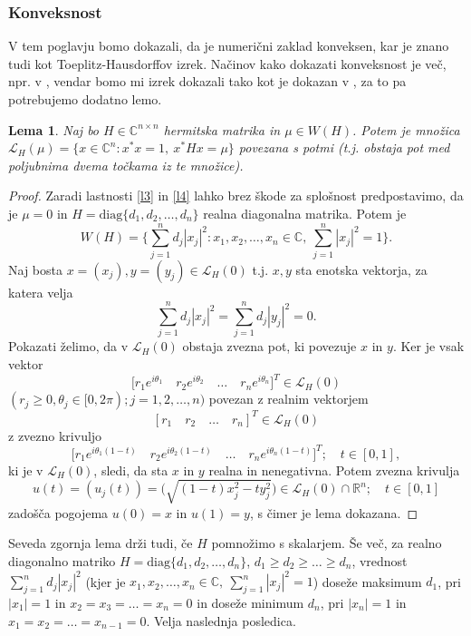\documentclass[12pt,a4paper]{amsart}
\theoremstyle{definition}
\theoremstyle{plain}
\newtheorem{lema}[definicija]{Lema}
\newcommand{\LH}{\mathcal{L}}
\newcommand{\R}{\mathbb R}
\newcommand{\C}{\mathbb C}
\begin{document}
\subsubsection{Konveksnost}
V tem poglavju bomo dokazali, da je numerični zaklad konveksen, kar je znano tudi kot Toeplitz-Hausdorffov izrek. 
Načinov kako dokazati konveksnost je več, npr. v \cite{num}, vendar bomo mi izrek dokazali tako kot je dokazan v \cite{zaloga}, za to pa potrebujemo dodatno lemo. 
\begin{lema}\cite{zaloga}
Naj bo $H\in \C^{n\times n}$ hermitska matrika in $\mu \in W(H)$. Potem je množica $\LH _{H}(\mu)=\{x\in \C^n \! : x^\ast x=1,\ x^\ast Hx=\mu\}$ povezana s potmi (t.j. obstaja pot med poljubnima dvema točkama iz te množice).%
\end{lema}

\begin{proof}
Zaradi lastnosti \ref{l3} in \ref{l4} lahko brez škode za splošnost predpostavimo, da je $\mu=0$ in $H=\text{diag}\{d_1,d_2,\dots,d_n\}$ realna diagonalna matrika.
Potem je 
$$W(H)=\Big\{ \sum_{j=1}^{n} d_j|x_j|^2: x_1,x_2,\dots,x_n \in \C,\ \sum_{j=1}^{n} |x_j|^2=1\Big \}.$$
Naj bosta $x=(x_j), y=(y_j)\in \LH_{H}(0)$ t.j. $x,y$ sta enotska vektorja, za katera velja 
$$\sum_{j=1}^{n} d_j|x_j|^2=\sum_{j=1}^{n} d_j|y_j|^2=0.$$
 Pokazati želimo, da v $\LH_{H}(0)$ obstaja zvezna pot, ki povezuje $x$ in $y$. Ker je vsak vektor 
$$\Big[r_1 e^{i\theta_1}\quad  r_2 e^{i\theta_2}\quad  \dots\quad r_n e^{i\theta_n}\Big]^T \in \LH_{H}(0)$$  
$(r_j \geq 0, \theta_j\in [0, 2\pi); j=1,2,\dots,n)$ povezan z realnim vektorjem 
$$[r_1 \quad r_2 \quad \dots \quad r_n]^T \in \LH_{H}(0)$$
 z zvezno krivuljo
$$\Big[r_1 e^{i\theta_1(1-t)}\quad  r_2 e^{i\theta_2(1-t)}\quad  \dots\quad  r_n e^{i\theta_n(1-t)}\Big]^T; \quad t\in[0,1],$$
ki je v $\LH_{H}(0)$, sledi, da sta $x$ in $y$ realna in nenegativna. Potem zvezna krivulja
$$u(t)=(u_j(t))=\Big(\sqrt{(1-t)x^2_j -ty^2_j}\Big) \in \LH_{H}(0)\cap \R^n ; \quad t\in [0,1]$$
zadošča pogojema $u (0)=x$ in $u (1) =y$, s čimer je lema dokazana.
\end{proof}

Seveda zgornja lema drži tudi, če $H$ pomnožimo s skalarjem.
Še več, za realno diagonalno matriko $H=\text{diag}\{d_1,d_2,\dots,d_n\}$, $d_1\geq d_2\geq \dots \geq d_n$, vrednost $\sum_{j=1}^{n} d_j|x_j|^2$ 
(kjer je $x_1,x_2,\dots, x_n \in \C,\ \sum_{j=1}^{n}|x_j|^2 =1$) doseže maksimum $d_1$, pri $|x_1|=1$ in $x_2=x_3=\dots=x_n=0$ in doseže minimum $d_n$, pri $|x_n|=1$ in $x_1=x_2=\dots=x_{n-1}=0$. Velja naslednja posledica.
\end{document}
